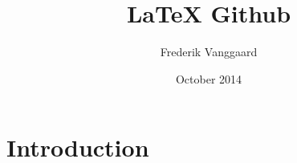 \documentclass{article}
\title{LaTeX Github}
\author{Frederik Vanggaard}
\date{October 2014}
\begin{document}
\maketitle

\section{Introduction}
\end{document}

